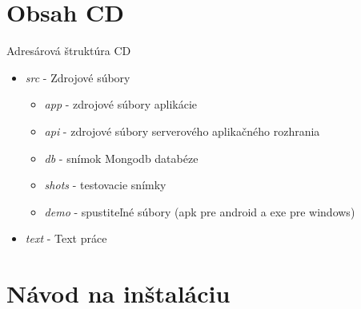 \chapter{Obsah CD}
\label{pr:cd}
Adresárová štruktúra CD
\begin{itemize}
\item \textit{src} - Zdrojové súbory
    \begin{itemize}
    \item \textit{app} - zdrojové súbory aplikácie
    \item \textit{api} - zdrojové súbory serverového aplikačného rozhrania
    \item \textit{db} - snímok Mongodb databéze
    \item \textit{shots} - testovacie snímky
    \item \textit{demo} - spustiteľné súbory (apk pre android a exe pre windows)
    \end{itemize}
\item \textit{text} - Text práce
\end{itemize}

\chapter{Návod na inštaláciu}
\label{pr:navod}
